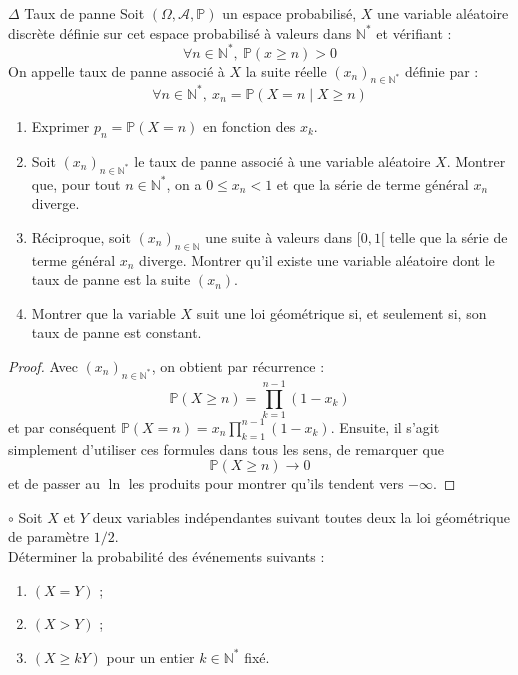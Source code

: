 \documentclass[french,a4paper]{article}
\renewcommand{\P}{\mathbb{P}}
\newcommand{\N}{\mathbb{N}}
\newcommand{\st}{^*}
\theoremstyle{plain}
\theoremstyle{definition}
\theoremstyle{remark}
\begin{document}
\begin{ex}{$\Delta$ Taux de panne}
	Soit $(\Omega,\mathcal{A},\P)$ un espace probabilisé, $X$ une variable aléatoire discrète définie sur cet espace probabilisé à valeurs dans $\N\st$ et vérifiant : $$\forall n\in\N\st,\ \P(x\geqslant n)>0$$ On appelle taux de panne associé à $X$ la suite réelle $(x_n)_{n\in\N\st}$ définie par : $$\forall n\in\N\st,\ x_n=\P(X=n\mid X\geqslant n)$$
	\begin{enumerate}
		\item Exprimer $p_n=\P(X=n)$ en fonction des $x_k$.
		\item Soit $(x_n)_{n\in\N\st}$ le taux de panne associé à une variable aléatoire $X$. Montrer que, pour tout $n\in\N\st$, on a $0\leqslant x_n<1$ et que la série de terme général $x_n$ diverge.
		\item Réciproque, soit $(x_n)_{n\in\N}$ une suite à valeurs dans $[0,1[$ telle que la série de terme général $x_n$ diverge. Montrer qu'il existe une variable aléatoire dont le taux de panne est la suite $(x_n)$.
		\item Montrer que la variable $X$ suit une loi géométrique si, et seulement si, son taux de panne est constant.
	\end{enumerate}
\end{ex}
\begin{proof}
	Avec $(x_n)_{n\in\N\st}$, on obtient par récurrence : $$\P(X\geqslant n)=\prod_{k=1}^{n-1}(1-x_k)$$ et par conséquent $\P(X=n)=x_n\prod_{k=1}^{n-1}(1-x_k)$. Ensuite, il s'agit simplement d'utiliser ces formules dans tous les sens, de remarquer que $$\P(X\geqslant n)\to 0$$ et de passer au $\ln$ les produits pour montrer qu'ils tendent vers $-\infty$.
\end{proof}

\begin{ex}{$\circ$}
	Soit $X$ et $Y$ deux variables indépendantes suivant toutes deux la loi géométrique de paramètre $1/2$. \\ Déterminer la probabilité des événements suivants :
	\begin{enumerate}
		\item $(X=Y)$ ;
		\item $(X>Y)$ ;
		\item $(X\geqslant kY)$ pour un entier $k\in\N\st$ fixé.
	\end{enumerate}
\end{ex}
\end{document}
